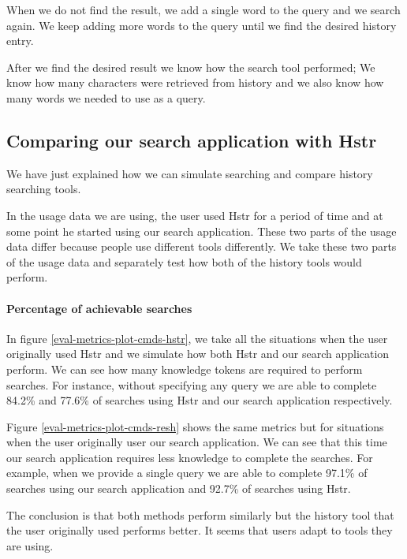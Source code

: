 When we do not find the result, we add a single word to the query and we search again. We keep adding more words to the query until we find the desired history entry. 

After we find the desired result we know how the search tool performed; We know how many characters were retrieved from history and we also know how many words we needed to use as a query.

\subsection{Comparing our search application with Hstr}

We have just explained how we can simulate searching and compare history searching tools.

In the usage data we are using, the user used Hstr for a period of time and at some point he started using our search application. These two parts of the usage data differ because people use different tools differently. We take these two parts of the usage data and separately test how both of the history tools would perform.

\paragraph{Percentage of achievable searches}

In figure \ref{eval-metrics-plot-cmds-hstr}, we take all the situations when the user originally used Hstr and we simulate how both Hstr and our search application perform.
We can see how many knowledge tokens are required to perform searches. For instance, without specifying any query we are able to complete 84.2\% and 77.6\% of searches using Hstr and our search application respectively. 

Figure \ref{eval-metrics-plot-cmds-resh} shows the same metrics but for situations when the user originally user our search application. We can see that this time our search application requires less knowledge to complete the searches. For example, when we provide a single query we are able to complete 97.1\% of searches using our search application and 92.7\% of searches using Hstr. 

The conclusion is that both methods perform similarly but the history tool that the user originally used performs better. It seems that users adapt to tools they are using.

